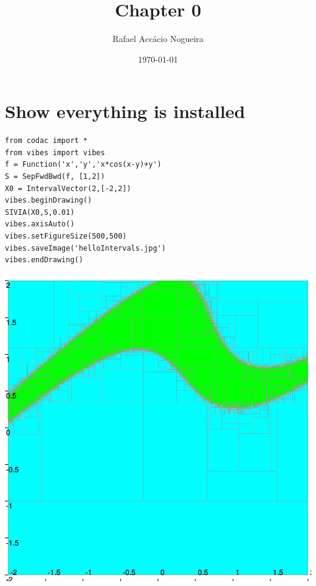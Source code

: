 \documentclass[11pt]{article}
\author{Rafael Accácio Nogueira}
\date{\today}
\title{Chapter 0}
\begin{document}
\maketitle


\section{Show everything is installed}
\label{sec:org20f585b}

\begin{verbatim}
from codac import *
from vibes import vibes
f = Function('x','y','x*cos(x-y)+y')
S = SepFwdBwd(f, [1,2])
X0 = IntervalVector(2,[-2,2])
vibes.beginDrawing()
SIVIA(X0,S,0.01)
vibes.axisAuto()
vibes.setFigureSize(500,500)
vibes.saveImage('helloIntervals.jpg')
vibes.endDrawing()
\end{verbatim}

\begin{center}
\includegraphics[width=.9\linewidth]{helloIntervals.jpg}
\end{center}
\end{document}
